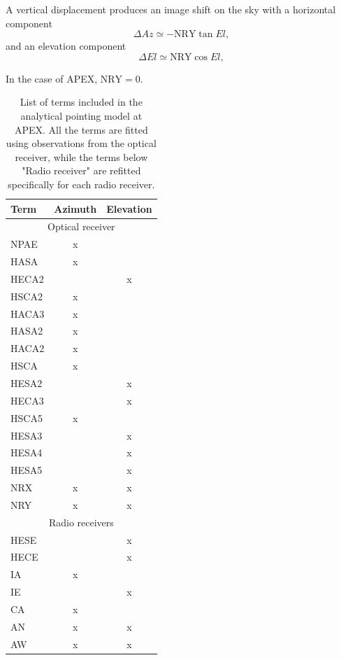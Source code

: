 A vertical displacement produces an image shift on the sky with a horizontal component 
\begin{equation}
    \Delta Az \simeq - \text{NRY} \tan{El},
\end{equation}
and an elevation component
\begin{equation}
    \Delta El \simeq \text{NRY} \cos{El},
\end{equation}

In the case of APEX, $\text{NRY}=0$.



\begin{table}[!htbp]
    \centering
    \caption[List of terms in the analytical pointing model at APEX]{List of terms included in the analytical pointing model at APEX.
    All the terms are fitted using observations from the optical receiver,
    while the terms below "Radio receiver" are refitted specifically for each radio receiver. }
    \begin{tabular}{lcc}
        \toprule
    \textbf{Term} & \textbf{Azimuth} & \textbf{Elevation} \\
    \hline
    \multicolumn{3}{c}{Optical receiver} \\ 
    \hline
    NPAE  & x &  \\
    HASA  & x &  \\
    HECA2 &  & x \\
    HSCA2 & x &  \\
    HACA3 & x &  \\
    HASA2 & x &  \\
    HACA2 & x &  \\
    HSCA  & x &  \\
    HESA2 &  & x \\
    HECA3 &  & x \\
    HSCA5 & x &  \\
    HESA3 &  & x \\
    HESA4 &  & x \\
    HESA5 &  & x \\
    NRX   & x & x \\
    NRY   & x & x \\
    \hline
    \multicolumn{3}{c}{Radio receivers} \\
    \hline
    HESE  &  & x \\
    HECE  &  & x \\
    IA    & x &  \\
    IE    &  & x \\
    CA    & x &  \\
    AN    & x & x \\
    AW    & x & x \\
    \bottomrule 
    \end{tabular}
    \label{tab:analytical_terms}
\end{table}


